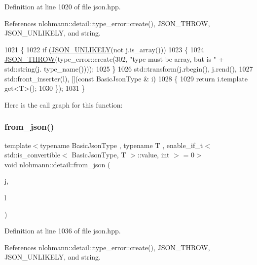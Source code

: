 Definition at line 1020 of file json.\+hpp.



References nlohmann\+::detail\+::type\+\_\+error\+::create(), J\+S\+O\+N\+\_\+\+T\+H\+R\+OW, J\+S\+O\+N\+\_\+\+U\+N\+L\+I\+K\+E\+LY, and string.


\begin{DoxyCode}
1021 \{
1022     \textcolor{keywordflow}{if} (\hyperlink{json_8hpp_ab77582407c64944e7db1ea95ab520253}{JSON\_UNLIKELY}(not j.is\_array()))
1023     \{
1024         \hyperlink{json_8hpp_a6c274f6db2e65c1b66c7d41b06ad690f}{JSON\_THROW}(type\_error::create(302, \textcolor{stringliteral}{"type must be array, but is "} + std::string(j.
      type\_name())));
1025     \}
1026     std::transform(j.rbegin(), j.rend(),
1027                    std::front\_inserter(l), [](\textcolor{keyword}{const} BasicJsonType & i)
1028     \{
1029         \textcolor{keywordflow}{return} i.template get<T>();
1030     \});
1031 \}
\end{DoxyCode}
Here is the call graph for this function\+:
\mbox{\label{namespacenlohmann_1_1detail_a3df497b1d3977f071b488ecac1401517}} 
\subsubsection{\texorpdfstring{from\+\_\+json()}{from\_json()}\hspace{0.1cm}{\footnotesize\ttfamily [9/14]}}
{\footnotesize\ttfamily template$<$typename Basic\+Json\+Type , typename T , enable\+\_\+if\+\_\+t$<$ std\+::is\+\_\+convertible$<$ Basic\+Json\+Type, T $>$\+::value, int $>$  = 0$>$ \\
void nlohmann\+::detail\+::from\+\_\+json (\begin{DoxyParamCaption}\item[{const Basic\+Json\+Type \&}]{j,  }\item[{std\+::valarray$<$ T $>$ \&}]{l }\end{DoxyParamCaption})}



Definition at line 1036 of file json.\+hpp.



References nlohmann\+::detail\+::type\+\_\+error\+::create(), J\+S\+O\+N\+\_\+\+T\+H\+R\+OW, J\+S\+O\+N\+\_\+\+U\+N\+L\+I\+K\+E\+LY, and string.


